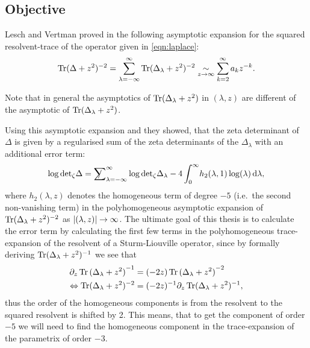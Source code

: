 \subsection{Objective}
Lesch and Vertman proved in \cite{LV13} the following asymptotic expansion for
the squared resolvent-trace of the operator given in \cref{eqn:laplace}:
\begin{align}
  \operatorname{Tr}(\Delta + z^2)^{-2} = \sum_{\lambda=-\infty}^\infty \operatorname{Tr}(\Delta_\lambda +
  z^2)^{-2} \mathrel{\underset{z\to\infty}{\sim}} \sum_{k=2}^{\infty} a_kz^{-k}.
\end{align}
\begin{Remark}
  Note that in general the asymptotics of $\operatorname{Tr}(\Delta_\lambda + z^2)$ in
  $(\lambda,z)$ are different of the asymptotic of $\operatorname{Tr}(\Delta_\lambda + z^2)$.
\end{Remark}
Using this asymptotic expansion and  they showed, that the
zeta determinant of $\Delta$ is given by a regularised sum of the
zeta determinants of the $\Delta_\lambda$ with an additional error term:
\begin{align}
  \label{eqn:central-thm}
  \log\zdet\Delta = \Regsum_{\lambda=-\infty}^\infty
  \log\zdet\Delta_\lambda -
  4\Integ[\infty]{0}{\lambda}{h_2(\lambda, 1)\log(\lambda)},
\end{align}
where $h_2(\lambda, z)$ denotes the homogeneous term of degree $-5$ (i.e.\ the
second non-vanishing term) in the polyhomogeneous asymptotic expansion of
$\operatorname{Tr}(\Delta_\lambda + z^2)^{-2}$ as $\left|(\lambda, z)\right|\to\infty$. The ultimate
goal of this thesis is to calculate the error term by calculating the first few
terms in the polyhomogeneous trace-expansion of the resolvent of a
Sturm-Liouville operator, since by formally deriving $\operatorname{Tr}(\Delta_\lambda +
z^2)^{-1}$ we see that
\begin{align}
  \label{frm:shift}
  \partial_z \Tr{(\Delta_\lambda + z^2)}^{-1} &=
        (-2z) \Tr{(\Delta_\lambda + z^2)}^{-2} \\
        \Leftrightarrow \Tr(\Delta_\lambda + z^2)^{-2} &=
        (-2z)^{-1}\partial_z\Tr(\Delta_\lambda + z^2)^{-1},
\end{align}
thus the order of the homogeneous components is from the resolvent to the
squared resolvent is shifted by 2. This means, that to get the component of
order $-5$ we will need to find the homogeneous component in the trace-expansion
of the parametrix of order $-3$.
